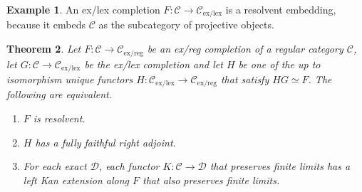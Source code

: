 \documentclass[sort&compress,draft]{elsarticle}
\theoremstyle{plain}
\newtheorem{theorem}{Theorem}
\theoremstyle{definition}
\newtheorem{example}[theorem]{Example}
\theoremstyle{remark}
\newcommand\hide[1]{}
\newcommand\cat\mathcal
\newcommand\exlex{_\mathrm{ex/lex}}\newcommand\exreg{_\mathrm{ex/reg}}
\newcommand\of:
\begin{document}
\begin{example} An ex/lex completion $F\of\cat C\to\cat C\exlex$ is a resolvent embedding, because it embeds $\cat C$ as the subcategory of projective objects. \hide{cite for both definitions and theorems} \end{example}


\begin{theorem} Let $F:\cat C\to\cat C\exreg$ be an ex/reg completion of a regular category $\cat C$, let $G\of \cat C \to \cat C\exlex$ be the ex/lex completion and let $H$ be one of the up to isomorphism unique functors $H\of\cat C\exlex \to \cat C\exreg$ that satisfy $HG\simeq F$. 
The following are equivalent.
\begin{enumerate}
\item $F$ is resolvent.
\item $H$ has a fully faithful right adjoint.
\item For each exact $\cat D$, each functor $K\of \cat C \to \cat D$ that preserves finite limits has a left Kan extension along $F$ that also preserves finite limits.
\end{enumerate}
\end{theorem}
\end{document}
